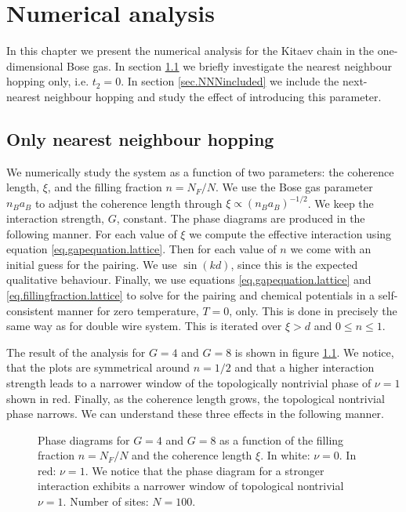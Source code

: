 \chapter{Numerical analysis} %

\label{Chapter8} 

In this chapter we present the numerical analysis for the Kitaev chain in the one-dimensional Bose gas. In section \ref{sec.onlyNN} we briefly investigate the nearest neighbour hopping only, i.e. $t_2 = 0$. In section \ref{sec.NNNincluded} we include the next-nearest neighbour hopping and study the effect of introducing this parameter. 
 
\section{Only nearest neighbour hopping} \label{sec.onlyNN}
We numerically study the system as a function of two parameters: the coherence length, $\xi$, and the filling fraction $n = N_F/N$. We use the Bose gas parameter $n_Ba_B$ to adjust the coherence length through $\xi \propto (n_Ba_B)^{-1/2}$. We keep the interaction strength, $G$, constant. The phase diagrams are produced in the following manner. For each value of $\xi$ we compute the effective interaction using equation \eqref{eq.gapequation.lattice}. Then for each value of $n$ we come with an initial guess for the pairing. We use $\sin(kd)$, since this is the expected qualitative behaviour. Finally, we use equations \eqref{eq.gapequation.lattice} and \eqref{eq.fillingfraction.lattice} to solve for the pairing and chemical potentials in a self-consistent manner for zero temperature, $T = 0$, only. This is done in precisely the same way as for double wire system. This is iterated over $\xi > d$ and $0\leq n \leq 1$. 

The result of the analysis for $G = 4$ and $G = 8$ is shown in figure \ref{fig.phasediagram.t20}. We notice, that the plots are symmetrical around $n = 1/2$ and that a higher interaction strength leads to a narrower window of the topologically nontrivial phase of $\nu = 1$ shown in red. Finally, as the coherence length grows, the topological nontrivial phase narrows. We can understand these three effects in the following manner. 

\begin{figure}
\begin{center}

\caption{Phase diagrams for $G = 4$ and $G = 8$ as a function of the filling fraction $n = N_F/N$ and the coherence length $\xi$. In white: $\nu = 0$. In red: $\nu = 1$. We notice that the phase diagram for a stronger interaction exhibits a narrower window of topological nontrivial $\nu = 1$. Number of sites: $N = 100$. }
\label{fig.phasediagram.t20}
\end{center}
\end{figure}

